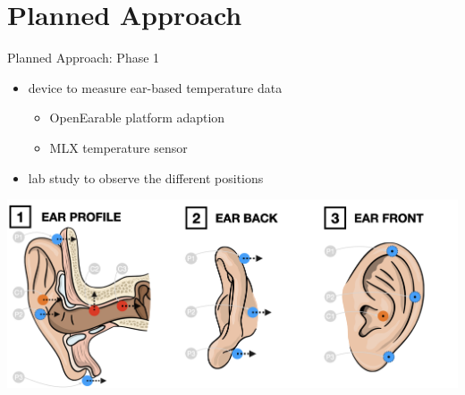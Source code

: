 \documentclass[en]{sdqbeamer}
\begin{document}

\section{Planned Approach}
\begin{frame}{Planned Approach: Phase 1}
    \begin{itemize}
        \item device to measure ear-based temperature data
        \begin{itemize}
            \item OpenEarable platform adaption
            \item MLX temperature sensor
        \end{itemize}
        \item lab study to observe the different positions
    \end{itemize}
    \begin{center}
        \includegraphics[scale=0.17]{../thesis-doc/images/ear_measurement_points/emp.png}    
    \end{center}
\end{frame}
\end{document}

